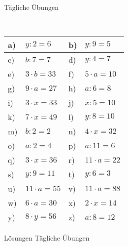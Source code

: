 \documentclass[12pt]{article}
\begin{document}
\centerline{{\Large Tägliche Übungen}} 
\vspace{1cm}
\noindent \\


\begin{xltabular}{\textwidth}{|C{0.75cm}|X|C{0.75cm}|X|}
\hline
a)&$y:2=6$
&
b)&$y:9=5$
\\\hline
c)&$b:7=7$
&
d)&$y:4=7$
\\\hline
e)&$3\cdot b=33$
&
f)&$5\cdot a=10$
\\\hline
g)&$9\cdot a=27$
&
h)&$a:6=8$
\\\hline
i)&$3\cdot x=33$
&
j)&$x:5=10$
\\\hline
k)&$7\cdot x=49$
&
l)&$y:8=10$
\\\hline
m)&$b:2=2$
&
n)&$4\cdot x=32$
\\\hline
o)&$a:2=4$
&
p)&$a:11=6$
\\\hline
q)&$3\cdot x=36$
&
r)&$11\cdot a=22$
\\\hline
s)&$y:9=11$
&
t)&$y:6=3$
\\\hline
u)&$11\cdot a=55$
&
v)&$11\cdot a=88$
\\\hline
w)&$6\cdot a=30$
&
x)&$2\cdot x=14$
\\\hline
y)&$8\cdot y=56$
&
z)&$a:8=12$
\\\hline
\end{xltabular}
\vspace{0.5cm}
\newpage
{}
\centerline{{\large Lösungen Tägliche Übungen}} 
\vspace{0.5cm}
\end{document}
